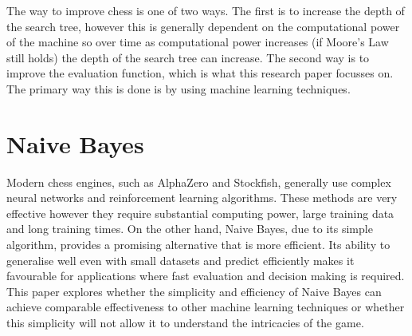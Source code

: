 The way to improve chess is one of two ways. The first is to increase the depth of the search tree, however this is generally dependent on the computational power of the machine so over time as computational power increases (if Moore's Law still holds) the depth of the search tree can increase. The second way is to improve the evaluation function, which is what this research paper focusses on. The primary way this is done is by using machine learning techniques. 

\section{Naive Bayes}

Modern chess engines, such as AlphaZero and Stockfish, generally use complex neural networks and reinforcement learning algorithms. These methods are very effective however they require substantial computing power, large training data and long training times. On the other hand, Naive Bayes, due to its simple algorithm, provides a promising alternative that is more efficient. Its ability to generalise well even with small datasets and predict efficiently makes it favourable for applications where fast evaluation and decision making is required. This paper explores whether the simplicity and efficiency of Naive Bayes can achieve comparable effectiveness to other machine learning techniques or whether this simplicity will not allow it to understand the intricacies of the game.


